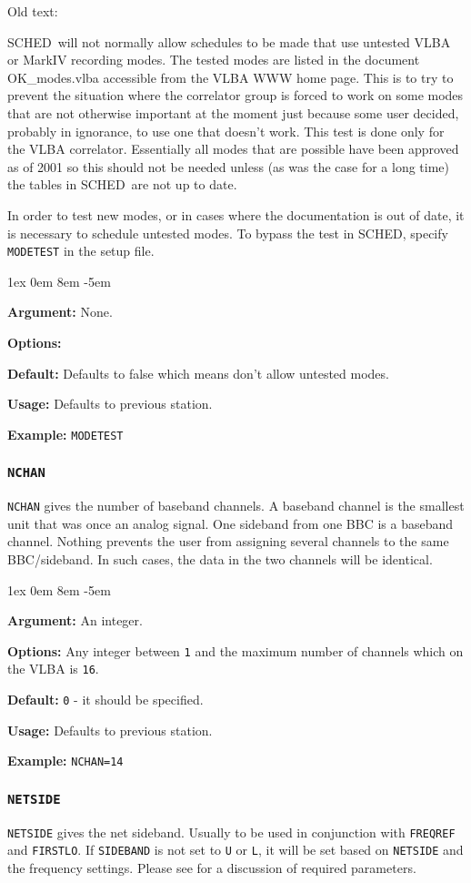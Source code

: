 \documentclass{report}
\newcommand{\sched}{{\sc SCHED}}
\newcommand{\schedb}{{\sc SCHED~}}
\newcommand{\rcwbox}[5]{
  \begin{list}{}{\parsep 1ex  \itemsep 0em
                 \leftmargin 8em  \itemindent -5em }
    \item {\bf Argument:} #1
    \item {\bf Options:}  #2
    \item {\bf Default:}  #3
    \item {\bf Usage:}    #4
    \item {\bf Example:}  #5
  \end{list}
}
\begin{document}
Old text:

\schedb will not normally allow schedules to be made that use
untested VLBA or MarkIV recording modes.  The tested modes are
listed in the document OK\_modes.vlba accessible from the VLBA
WWW home page.  This is to try to prevent the situation where
the correlator group is forced to work on some modes that are
not otherwise important at the moment just because some user
decided, probably in ignorance, to use one that doesn't work.
This test is done only for the VLBA correlator.  Essentially
all modes that are possible have been approved as of 2001 so this
should not be needed unless (as was the case for a long time) the
tables in \schedb are not up to date.

In order to test new modes, or in cases where the documentation
is out of date, it is necessary to schedule untested modes.  To
bypass the test in \sched, specify {\tt MODETEST} in the setup
file.

\rcwbox
{None.}
{}
{Defaults to false which means don't allow untested modes.}
{Defaults to previous station.}
{{\tt MODETEST}}



\subsubsection{\label{SP:NCHAN}{\tt NCHAN}}

{\tt NCHAN} gives the number of baseband channels. A baseband channel
is the smallest unit that was once an analog signal. One sideband from
one BBC is a baseband channel. Nothing prevents the user from
assigning several channels to the same BBC/sideband. In such cases,
the data in the two channels will be identical.

\rcwbox
{An integer.}
{Any integer between {\tt 1} and the maximum number of channels which
on the VLBA is {\tt 16}.}
{{\tt 0} - it should be specified.}
{Defaults to previous station.}
{{\tt NCHAN=14}}


\subsubsection{\label{SP:NETSIDE}{\tt NETSIDE}}

{\tt NETSIDE} gives the net sideband. Usually to be used in
conjunction with {\tt FREQREF} and {\tt FIRSTLO}. If {\tt SIDEBAND} is
not set to {\tt U} or {\tt L}, it will be set based on {\tt NETSIDE}
and the frequency settings. Please see
 for a discussion of required
parameters.
\end{document}
